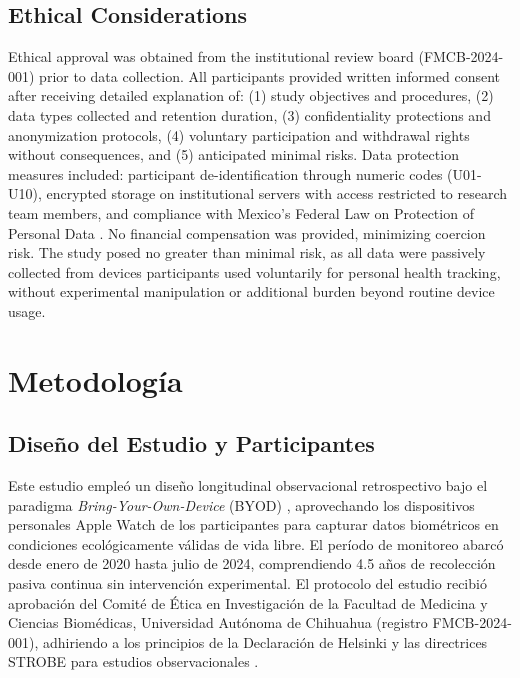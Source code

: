\subsection{Ethical Considerations}
\label{subsec:ethics}

Ethical approval was obtained from the institutional review board (FMCB-2024-001) prior to data collection. All participants provided written informed consent after receiving detailed explanation of: (1) study objectives and procedures, (2) data types collected and retention duration, (3) confidentiality protections and anonymization protocols, (4) voluntary participation and withdrawal rights without consequences, and (5) anticipated minimal risks. Data protection measures included: participant de-identification through numeric codes (U01-U10), encrypted storage on institutional servers with access restricted to research team members, and compliance with Mexico's Federal Law on Protection of Personal Data \cite{Liu2022}. No financial compensation was provided, minimizing coercion risk. The study posed no greater than minimal risk, as all data were passively collected from devices participants used voluntarily for personal health tracking, without experimental manipulation or additional burden beyond routine device usage.



\section{Metodología}
\label{sec:metodologia}

\subsection{Diseño del Estudio y Participantes}
\label{subsec:diseno}

Este estudio empleó un diseño longitudinal observacional retrospectivo bajo el paradigma \textit{Bring-Your-Own-Device} (BYOD) \cite{Liu2022}, aprovechando los dispositivos personales Apple Watch de los participantes para capturar datos biométricos en condiciones ecológicamente válidas de vida libre. El período de monitoreo abarcó desde enero de 2020 hasta julio de 2024, comprendiendo 4.5 años de recolección pasiva continua sin intervención experimental. El protocolo del estudio recibió aprobación del Comité de Ética en Investigación de la Facultad de Medicina y Ciencias Biomédicas, Universidad Autónoma de Chihuahua (registro FMCB-2024-001), adhiriendo a los principios de la Declaración de Helsinki \cite{WMA2013} y las directrices STROBE para estudios observacionales \cite{VonElm2007STROBE}.

